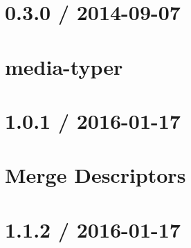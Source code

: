 \let\mypdfximage\pdfximage\def\pdfximage{\immediate\mypdfximage}\documentclass[twoside]{book}
\newcommand{\+}{\discretionary{\mbox{\scriptsize$\hookleftarrow$}}{}{}}
\begin{document}
\chapter{0.3.0 / 2014-\/09-\/07}
\label{md__c_1__git_hub__p_r_o_y_e_c_t_o-_i_i_i-_g_o_t_rest-api-node-mysql_node_modules_media-typer__h_i_s_t_o_r_y}

\chapter{media-\/typer}
\label{md__c_1__git_hub__p_r_o_y_e_c_t_o-_i_i_i-_g_o_t_rest-api-node-mysql_node_modules_media-typer__r_e_a_d_m_e}

\chapter{1.0.1 / 2016-\/01-\/17}
\label{md__c_1__git_hub__p_r_o_y_e_c_t_o-_i_i_i-_g_o_t_rest-api-node-mysql_node_modules_merge-descriptors__h_i_s_t_o_r_y}

\chapter{Merge Descriptors}
\label{md__c_1__git_hub__p_r_o_y_e_c_t_o-_i_i_i-_g_o_t_rest-api-node-mysql_node_modules_merge-descriptors__r_e_a_d_m_e}

\chapter{1.1.2 / 2016-\/01-\/17}
\label{md__c_1__git_hub__p_r_o_y_e_c_t_o-_i_i_i-_g_o_t_rest-api-node-mysql_node_modules_methods__h_i_s_t_o_r_y}

\end{document}

